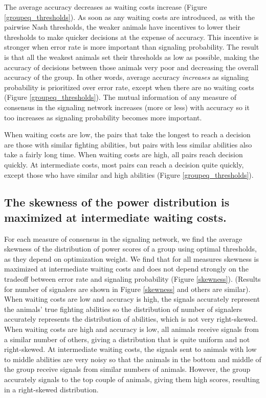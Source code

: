 \documentclass{article}
\begin{document}
The average accuracy decreases as waiting costs increase (Figure \ref{groupeq_thresholds}).  As soon as any waiting costs are introduced, as with the pairwise Nash thresholds, the weaker animals have incentives to lower their thresholds to make quicker decisions at the expense of accuracy.  This incentive is stronger when error rate is more important than signaling probability.  The result is that all the weakest animals set their thresholds as low as possible, making the accuracy of decisions between those animals very poor and decreasing the overall accuracy of the group. In other words, average accuracy \emph{increases} as signaling probability is prioritized over error rate, except when there are no waiting costs (Figure \ref{groupeq_thresholds}). The mutual information of any measure of consensus in the signaling network increases (more or less) with accuracy so it too increases as signaling probability becomes more important.  

When waiting costs are low, the pairs that take the longest to reach a decision are those with similar fighting abilities, but pairs with less similar abilities also take a fairly long time.  When waiting costs are high, all pairs reach decision quickly.  At intermediate costs, most pairs can reach a decision quite quickly, except those who have similar and high abilities (Figure \ref{groupeq_thresholds}).   

\subsection{The skewness of the power distribution is maximized at intermediate waiting costs.  }
For each measure of consensus in the signaling network, we find the average skewness of the distribution of power scores of a group using optimal thresholds, as they depend on optimization weight.  We find that for all measures skewness is maximized at intermediate waiting costs and does not depend strongly on the tradeoff between error rate and signaling probability (Figure \ref{skewness}). (Results for number of signalers are shown in Figure \ref{skewness} and others are similar).  When waiting costs are low and accuracy is high, the signals accurately represent the animals' true fighting abilities so the distribution of number of signalers accurately represents the distribution of abilities, which is not very right-skewed.  When waiting costs are high and accuracy is low, all animals receive signals from a similar number of others, giving a distribution that is quite uniform and not right-skewed.  At intermediate waiting costs, the signals sent to animals with low to middle abilities are very noisy so that the animals in the bottom and middle of the group receive signals from similar numbers of animals.  However, the group accurately signals to the top couple of animals, giving them high scores, resulting in a right-skewed distribution. 
\end{document}
